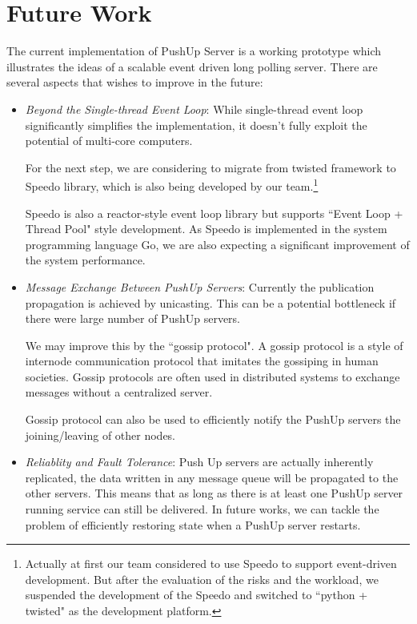 \section{Future Work}

The current implementation of PushUp Server is a working prototype which illustrates
the ideas of a scalable event driven long polling server. There are several aspects that
wishes to improve in the future:

\begin{itemize}
\item \emph{Beyond the Single-thread Event Loop}: While single-thread event loop 
        significantly simplifies the implementation, it doesn't fully exploit the
        potential of multi-core computers. 
        
        For the next step, we are considering to migrate from twisted
        framework to Speedo library, which is also being developed by our team.\footnote{
            Actually at first our team considered to use Speedo to support event-driven
            development. But after the evaluation of the risks and the workload, we suspended
            the development of the Speedo and switched to ``python + twisted" as the
            development platform.}

        Speedo is also a reactor-style event loop library but supports 
        ``Event Loop + Thread Pool" style development. As Speedo is implemented 
        in the system programming language Go\cite{GoLang}, we are also expecting a 
        significant improvement of the system performance.

\item \emph {Message Exchange Between PushUp Servers}: Currently the publication 
        propagation is achieved by unicasting. This can be a potential bottleneck
        if there were large number of PushUp servers. 

        We may improve this by the ``gossip protocol". A gossip protocol is a 
        style of internode communication protocol that imitates the gossiping 
        in human societies. Gossip protocols are often used in distributed 
        systems to exchange messages without a centralized server. 

        Gossip protocol can also be used to efficiently notify the PushUp servers
        the joining/leaving of other nodes.

\item \emph {Reliablity and Fault Tolerance}:
    Push Up servers are actually inherently replicated, the data written in any
    message queue will be propagated
    to the other servers. This means that as long as there is at least one 
    PushUp server running
    service can still be delivered. In future works, we can tackle the problem of efficiently
    restoring state when a PushUp server restarts.
\end{itemize}

